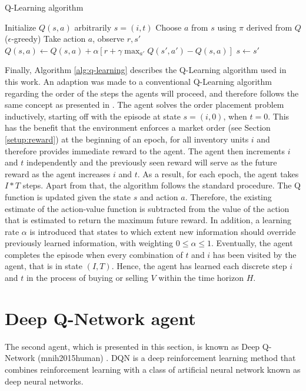 \begin{algorithm}
\caption{Q-Learning algorithm}\label{alg:q-learning}
\begin{algorithmic}[1]
\State Initialize $Q(s,a)$ arbitrarily
\State $s=(i, t)$
\State Choose $a$ from $s$ using $\pi$ derived from $Q$ ($\epsilon$-greedy)
\State Take action $a$, observe $r, s'$
\State $Q(s,a) \gets Q(s,a)+ \alpha[r+ \gamma \max_{a'}Q(s',a')-Q(s,a)]$
\State $s \gets s'$
\EndFor
\EndFor
\EndFor
\end{algorithmic}
\end{algorithm}
Finally, Algorithm \ref{alg:q-learning} describes the Q-Learning algorithm used in this work.
An adaption was made to a conventional Q-Learning algorithm\cite{sutton1998reinforcement} regarding the order of the steps the agents will proceed, and therefore follows the same concept as presented in \cite{nevmyvaka2006reinforcement}.
The agent solves the order placement problem inductively, starting off with the episode at state $s=(i,0)$, when $t=0$.
This has the benefit that the environment enforces a market order (see Section \ref{setup:reward}) at the beginning of an epoch, for all inventory units $i$ and therefore provides immediate reward to the agent.
The agent then increments $i$ and $t$ independently and the previously seen reward will serve as the future reward as the agent increases $i$ and $t$.
As a result, for each epoch, the agent takes $I*T$ steps.
Apart from that, the algorithm follows the standard procedure.
The Q function is updated given the state $s$ and action $a$.
Therefore, the existing estimate of the action-value function is subtracted from the value of the action that is estimated to return the maximum future reward.
In addition, a learning rate $\alpha$ is introduced that states to which extent new information should override previously learned information, with weighting $0 \le \alpha \le 1$.
Eventually, the agent completes the episode when every combination of $t$ and $i$ has been visited by the agent, that is in state $(I, T)$.
Hence, the agent has learned each discrete step $i$ and $t$ in the process of buying or selling $V$ within the time horizon $H$.

\section{Deep Q-Network agent}
\label{setup:dqn}
The second agent, which is presented in this section, is known as Deep Q-Network (mnih2015human) \cite{mnih2015human}.
DQN is a deep reinforcement learning method that combines reinforcement learning with a class
of artificial neural network known as deep neural networks.

